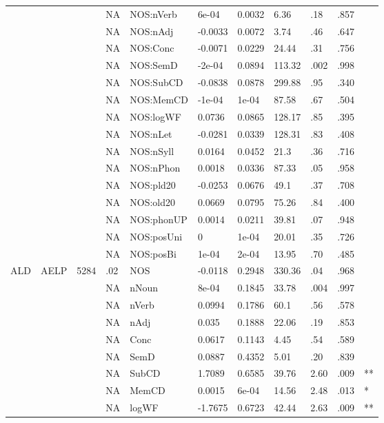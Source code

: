 \begin{table}[ht]
\begin{tabular}{lllllllllll}
   &  &  & NA & NOS:nVerb & 6e-04 & 0.0032 & 6.36 & .18 & .857 &   \\ 
   &  &  & NA & NOS:nAdj & -0.0033 & 0.0072 & 3.74 & .46 & .647 &   \\ 
   &  &  & NA & NOS:Conc & -0.0071 & 0.0229 & 24.44 & .31 & .756 &   \\ 
   &  &  & NA & NOS:SemD & -2e-04 & 0.0894 & 113.32 & .002 & .998 &   \\ 
   &  &  & NA & NOS:SubCD & -0.0838 & 0.0878 & 299.88 & .95 & .340 &   \\ 
   &  &  & NA & NOS:MemCD & -1e-04 & 1e-04 & 87.58 & .67 & .504 &   \\ 
   &  &  & NA & NOS:logWF & 0.0736 & 0.0865 & 128.17 & .85 & .395 &   \\ 
   &  &  & NA & NOS:nLet & -0.0281 & 0.0339 & 128.31 & .83 & .408 &   \\ 
   &  &  & NA & NOS:nSyll & 0.0164 & 0.0452 & 21.3 & .36 & .716 &   \\ 
   &  &  & NA & NOS:nPhon & 0.0018 & 0.0336 & 87.33 & .05 & .958 &   \\ 
   &  &  & NA & NOS:pld20 & -0.0253 & 0.0676 & 49.1 & .37 & .708 &   \\ 
   &  &  & NA & NOS:old20 & 0.0669 & 0.0795 & 75.26 & .84 & .400 &   \\ 
   &  &  & NA & NOS:phonUP & 0.0014 & 0.0211 & 39.81 & .07 & .948 &   \\ 
   &  &  & NA & NOS:posUni & 0 & 1e-04 & 20.01 & .35 & .726 &   \\ 
   &  &  & NA & NOS:posBi & 1e-04 & 2e-04 & 13.95 & .70 & .485 &   \\ 
  ALD & AELP & 5284 & .02 & NOS & -0.0118 & 0.2948 & 330.36 & .04 & .968 &   \\ 
   &  &  & NA & nNoun & 8e-04 & 0.1845 & 33.78 & .004 & .997 &   \\ 
   &  &  & NA & nVerb & 0.0994 & 0.1786 & 60.1 & .56 & .578 &   \\ 
   &  &  & NA & nAdj & 0.035 & 0.1888 & 22.06 & .19 & .853 &   \\ 
   &  &  & NA & Conc & 0.0617 & 0.1143 & 4.45 & .54 & .589 &   \\ 
   &  &  & NA & SemD & 0.0887 & 0.4352 & 5.01 & .20 & .839 &   \\ 
   &  &  & NA & SubCD & 1.7089 & 0.6585 & 39.76 & 2.60 & .009 & ** \\ 
   &  &  & NA & MemCD & 0.0015 & 6e-04 & 14.56 & 2.48 & .013 & * \\ 
   &  &  & NA & logWF & -1.7675 & 0.6723 & 42.44 & 2.63 & .009 & ** \\ 

\end{tabular}
\end{table}
